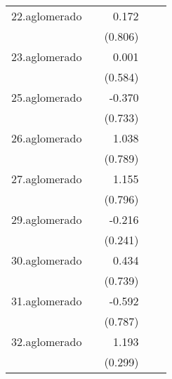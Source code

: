 {\begin{longtable}{l*{4}{D{.}{.}{-1}}}
\addlinespace
22.aglomerado&                     &       0.172         &                     &                     \\
            &                     &     (0.806)         &                     &                     \\
\addlinespace
23.aglomerado&                     &       0.001         &                     &                     \\
            &                     &     (0.584)         &                     &                     \\
\addlinespace
25.aglomerado&                     &      -0.370         &                     &                     \\
            &                     &     (0.733)         &                     &                     \\
\addlinespace
26.aglomerado&                     &       1.038         &                     &                     \\
            &                     &     (0.789)         &                     &                     \\
\addlinespace
27.aglomerado&                     &       1.155         &                     &                     \\
            &                     &     (0.796)         &                     &                     \\
\addlinespace
29.aglomerado&                     &      -0.216         &                     &                     \\
            &                     &     (0.241)         &                     &                     \\
\addlinespace
30.aglomerado&                     &       0.434         &                     &                     \\
            &                     &     (0.739)         &                     &                     \\
\addlinespace
31.aglomerado&                     &      -0.592         &                     &                     \\
            &                     &     (0.787)         &                     &                     \\
\addlinespace
32.aglomerado&                     &       1.193\sym{***}&                     &                     \\
            &                     &     (0.299)         &                     &                     \\

\end{longtable}}
